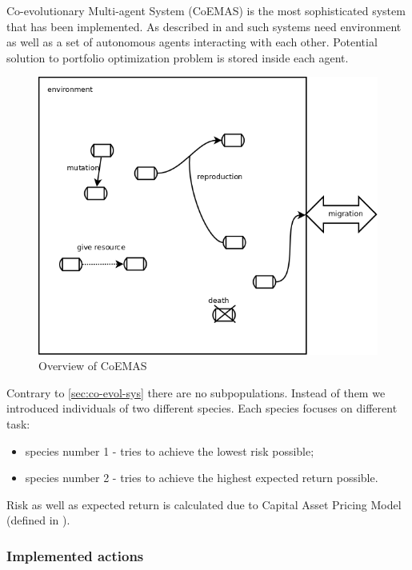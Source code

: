Co-evolutionary Multi-agent System (CoEMAS) is the most sophisticated system that has been implemented.
As described in \cite{drezewski2008coevolutionary} and \cite{drezewski2008agent-based-cooperative} such systems need environment as well as a set of autonomous agents interacting with each other.
Potential solution to portfolio optimization problem is stored inside each agent.


\begin{figure}[ht]   
	    \begin{center}
	      \includegraphics[scale=.2]{agent.png}
	    \end{center}
	    \caption{Overview of CoEMAS} 
	  \end{figure}

Contrary to \ref{sec:co-evol-sys} there are no subpopulations.
Instead of them we introduced individuals of two different species.
Each species focuses on different task:

\begin{itemize}
  \item species number 1 - tries to achieve the lowest risk possible;
  \item species number 2 - tries to achieve the highest expected return possible.
\end{itemize}

Risk as well as expected return is calculated due to Capital Asset Pricing Model (defined in \cite{CAPM}).

\subsubsection{Implemented actions}

